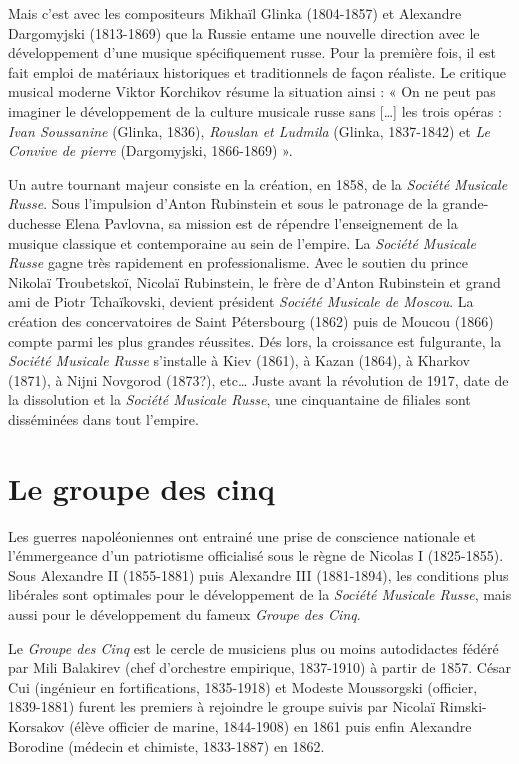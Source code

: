 Mais c'est avec les compositeurs Mikhaïl Glinka (1804-1857) et Alexandre Dargomyjski (1813-1869) que la Russie entame une nouvelle direction avec le développement d'une musique spécifiquement russe. Pour la première fois, il est fait emploi de matériaux historiques et traditionnels de façon réaliste. Le critique musical moderne Viktor Korchikov résume la situation ainsi : « On ne peut pas imaginer le développement de la culture musicale russe sans [\dots] les trois opéras : \emph{Ivan Soussanine} (Glinka, 1836), \emph{Rouslan et Ludmila} (Glinka, 1837-1842) et \emph{Le Convive de pierre} (Dargomyjski, 1866-1869) ».

Un autre tournant majeur consiste en la création, en 1858, de la \emph{Société Musicale Russe}. Sous l'impulsion d'Anton Rubinstein et sous le patronage de la grande-duchesse Elena Pavlovna, sa mission est de répendre l'enseignement de la musique classique et contemporaine au sein de l'empire. La \emph{Société Musicale Russe} gagne très rapidement en professionalisme. Avec le soutien du prince Nikolaï Troubetskoï, Nicolaï Rubinstein, le frère de d'Anton Rubinstein et grand ami de Piotr Tchaïkovski, devient président \emph{Société Musicale de Moscou}. La création des concervatoires de Saint Pétersbourg (1862) puis de Moucou (1866) compte parmi les plus grandes réussites. Dés lors, la croissance est fulgurante, la \emph{Société Musicale Russe} s'installe à Kiev (1861), à Kazan (1864), à Kharkov (1871), à Nijni Novgorod (1873?), etc\dots{} Juste avant la révolution de 1917, date de la dissolution et la \emph{Société Musicale Russe}, une cinquantaine de filiales sont disséminées dans tout l'empire. 

\section{Le groupe des cinq}

Les guerres napoléoniennes ont entrainé une prise de conscience nationale et l'émmergeance d'un patriotisme officialisé sous le règne de Nicolas I\ier{} (1825-1855).  Sous Alexandre II (1855-1881) puis Alexandre III (1881-1894), les conditions plus libérales sont optimales pour le développement de la \emph{Société Musicale Russe}, mais aussi pour le développement du fameux \emph{Groupe des Cinq}.

Le \emph{Groupe des Cinq} est le cercle de musiciens plus ou moins autodidactes fédéré par Mili Balakirev (chef d'orchestre empirique, 1837-1910) à partir de 1857. César Cui (ingénieur en fortifications, 1835-1918) et Modeste Moussorgski (officier, 1839-1881) furent les premiers à rejoindre le groupe suivis par Nicolaï Rimski-Korsakov (élève officier de marine, 1844-1908) en 1861 puis enfin Alexandre Borodine (médecin et chimiste, 1833-1887) en 1862.

